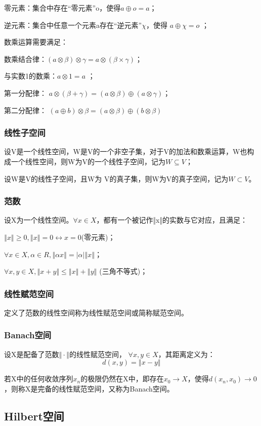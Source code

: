 \documentclass{article}
\begin{document}
零元素：集合中存在“零元素”o，使得$a \oplus o = a $；

逆元素：集合中任意一个元素a存在“逆元素”$\chi$，使得 $a\oplus \chi = o$ ；

数乘运算需要满足：

数乘结合律：$(a \otimes \beta ) \otimes \gamma= a \otimes (\beta \times \gamma)$；

与实数1的数乘：$a \otimes 1= a$ ；

第一分配律： $a \otimes (\beta + \gamma) = (a \otimes \beta) \oplus (a \otimes \gamma ) $；

第二分配律： $(a \oplus b) \otimes \beta = (a \otimes \beta) \oplus (b \otimes \beta )$

\subsubsection{线性子空间}
设V是一个线性空间，W是V的一个非空子集，对于V的加法和数乘运算，W也构成一个线性空间，则W为V的一个线性子空间，记为$W\subseteq V$；

设W是V的线性子空间，且W为 V的真子集，则W为V的真子空间，记为$W\subset V$。

\subsubsection{范数}
设X为一个线性空间。$\forall x \in X$，都有一个被记作‖x‖的实数与它对应，且满足：

$‖x‖\ge 0, ‖x‖=0 \leftrightarrow x=0 $(零元素)；

$\forall x\in X, \alpha\in R,  ‖\alpha x‖=|\alpha|‖x‖$；

$\forall x,y\in X, ‖x+y‖\le‖x‖+‖y‖$ (三角不等式)；

\subsubsection{线性赋范空间}
定义了范数的线性空间称为线性赋范空间或简称赋范空间。

\subsubsection{Banach空间}
设X是配备了范数$‖\cdot‖$的线性赋范空间， $\forall x,y\in X$，其距离定义为：
$$d(x,y)=‖x-y‖$$

若X中的任何收敛序列${x_n}$的极限仍然在X中，即存在$x_0\longrightarrow X$，使得$d(x_n,x_0)\longrightarrow 0$，则称X是完备的线性赋范空间，又称为Banach空间。

\subsection{Hilbert空间}
\end{document}
